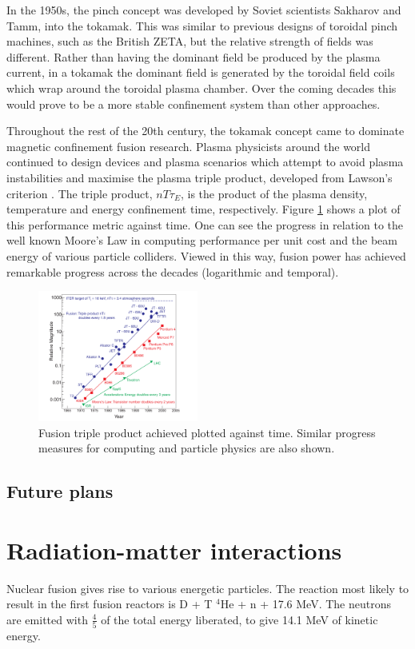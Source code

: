 In the 1950s, the pinch concept was developed by Soviet scientists Sakharov and Tamm, into the tokamak. This was similar to previous designs of toroidal pinch machines, such as the British ZETA, but the relative strength of fields was different. Rather than having the dominant field be produced by the plasma current, in a tokamak the dominant field is generated by the toroidal field coils which wrap around the toroidal plasma chamber. Over the coming decades this would prove to be a more stable confinement system than other approaches. 

Throughout the rest of the 20th century, the tokamak concept came to dominate magnetic confinement fusion research. Plasma physicists around the world continued to design devices and plasma scenarios which attempt to avoid plasma instabilities and maximise the plasma triple product, developed from Lawson's criterion \cite{lawson1955}. The triple product, $nT\tau_{E}$, is the product of the plasma density, temperature and energy confinement time, respectively. Figure \ref{fig:triple_product} shows a plot of this performance metric against time. One can see the progress in relation to the well known Moore's Law in computing performance per unit cost and the beam energy of various particle colliders. Viewed in this way, fusion power has achieved remarkable progress across the decades (logarithmic and temporal).

\begin{figure}
  \includegraphics[width=0.47\textwidth]{triple_product.png}
  \caption{Fusion triple product achieved plotted against time. Similar progress measures for computing and particle physics are also shown. }
  \label{fig:triple_product}
\end{figure}

\subsection{Future plans}

\section{Radiation-matter interactions}
Nuclear fusion gives rise to various energetic particles. The reaction most likely to result in the first fusion reactors is D + T \rightarrow $^{4}$He + n + 17.6 MeV. The neutrons are emitted with $\frac{4}{5}$ of the total energy liberated, to give 14.1 MeV of kinetic energy. 

